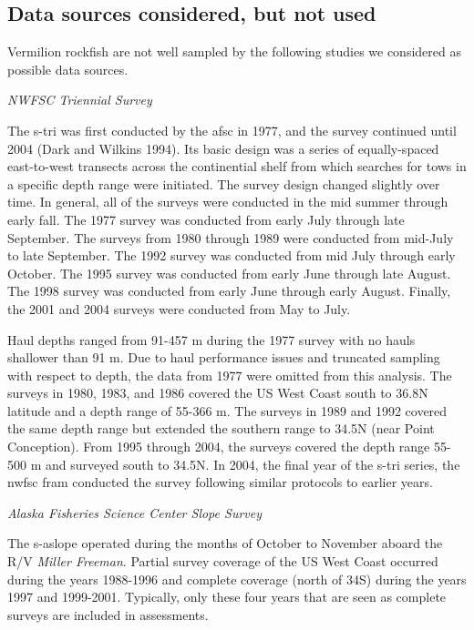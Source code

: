 \documentclass[11pt,
  english,
  a4paper,
]{article}
\begin{document}

\hypertarget{data-sources-considered-but-not-used}{%
\subsection{Data sources considered, but not used}\label{data-sources-considered-but-not-used}}

\leavevmode\tagmcend\tagstructend

Vermilion rockfish are not well sampled by the following studies we considered as possible data sources.

\emph{NWFSC Triennial Survey}

The \gls{s-tri} was first conducted by the \gls{afsc} in 1977, and the survey continued until 2004 {(Dark and Wilkins 1994)\leavevmode\tagmcend\tagstructend}. Its basic design was a series of equally-spaced east-to-west transects across the continential shelf from which searches for tows in a specific depth range were initiated. The survey design changed slightly over time. In general, all of the surveys were conducted in the mid summer through early fall. The 1977 survey was conducted from early July through late September. The surveys from 1980 through 1989 were conducted from mid-July to late September. The 1992 survey was conducted from mid July through early October. The 1995 survey was conducted from early June through late August. The 1998 survey was conducted from early June through early August. Finally, the 2001 and 2004 surveys were conducted from May to July.

Haul depths ranged from 91-457 m during the 1977 survey with no hauls shallower than 91 m. Due to haul performance issues and truncated sampling with respect to depth, the data from 1977 were omitted from this analysis. The surveys in 1980, 1983, and 1986 covered the US West Coast south to 36.8\textdegree N latitude and a depth range of 55-366 m. The surveys in 1989 and 1992 covered the same depth range but extended the southern range to 34.5\textdegree N (near Point Conception). From 1995 through 2004, the surveys covered the depth range 55-500 m and surveyed south to 34.5\textdegree N. In 2004, the final year of the \gls{s-tri} series, the \gls{nwfsc} \gls{fram} conducted the survey following similar protocols to earlier years.

\emph{Alaska Fisheries Science Center Slope Survey}

The \gls{s-aslope} operated during the months of October to November aboard the R/V \emph{Miller Freeman}. Partial survey coverage of the US West Coast occurred during the years 1988-1996 and complete coverage (north of 34\textquotesingle S) during the years 1997 and 1999-2001. Typically, only these four years that are seen as complete surveys are included in assessments.
\end{document}
